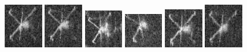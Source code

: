\begin{figure}
    \includegraphics[width=0.15\textwidth]{chapters/images/dataset/all-class-images/valve/valve-140.jpg}
    \includegraphics[width=0.15\textwidth]{chapters/images/dataset/all-class-images/valve/valve-149.jpg}
    \includegraphics[width=0.15\textwidth]{chapters/images/dataset/all-class-images/valve/valve-55.jpg}
    \includegraphics[width=0.15\textwidth]{chapters/images/dataset/all-class-images/valve/valve-207.jpg}
    \includegraphics[width=0.15\textwidth]{chapters/images/dataset/all-class-images/valve/valve-181.jpg}
    \includegraphics[width=0.15\textwidth]{chapters/images/dataset/all-class-images/valve/valve-157.jpg}
    

\end{figure}
